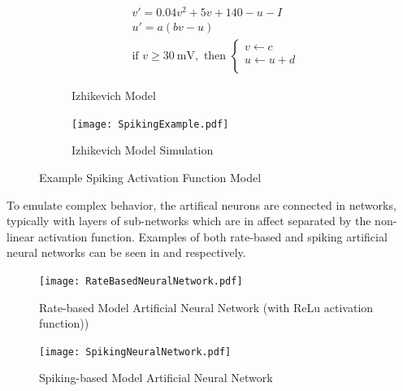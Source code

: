 \begin{figure}
\centering
\captionsetup{justification=centering}
\vspace{0.5cm}
\begin{subfigure}{.9\textwidth}
  \centering
  \begin{equation}
  \begin{split}
  &v' = 0.04v^2+5v + 140 - u - I\\
  &u' = a(bv-u)  \\
  &\text{if } v\ge  \SI{30}{\mV}, \text{ then } 
  \begin{cases}
      v \leftarrow c\\           
      u \leftarrow u+d\\           
  \end{cases} \nonumber
  \end{split}
  \end{equation}
    \caption{Izhikevich Model}
    \label{fig:Izhikevich Model}
  \end{subfigure}
\begin{subfigure}{.7\textwidth}
  \centering
  \mbox{\texttt{[image: SpikingExample.pdf]}}
  \captionsetup{justification=centering, skip=3pt}
  \caption{Izhikevich \cite{Iz2005} Model Simulation}
  \label{fig:spiking example}
\end{subfigure}
\caption{Example Spiking Activation Function Model}
\label{fig:Example Spiking Model}
\end{figure}

To emulate complex behavior, the artifical neurons are connected in networks, typically with layers of sub-networks which are in affect separated by the non-linear activation function.
Examples of both rate-based and spiking artificial neural networks can be seen in  and  respectively.



\begin{figure}[!t]
\centering
\captionsetup{justification=centering}
\captionsetup{width=.9\linewidth}
\centerline{
\mbox{\texttt{[image: RateBasedNeuralNetwork.pdf]}}
}
\caption{Rate-based Model Artificial Neural Network (with ReLu activation function))}
\label{fig:Rate-based Model Network}
\end{figure}

\begin{figure}[!t]
\centering
\captionsetup{justification=centering}
\captionsetup{width=.9\linewidth}
\centerline{
\mbox{\texttt{[image: SpikingNeuralNetwork.pdf]}}
}
\caption{Spiking-based Model Artificial Neural Network}
\label{fig:Spiking Model Network}
\end{figure}

